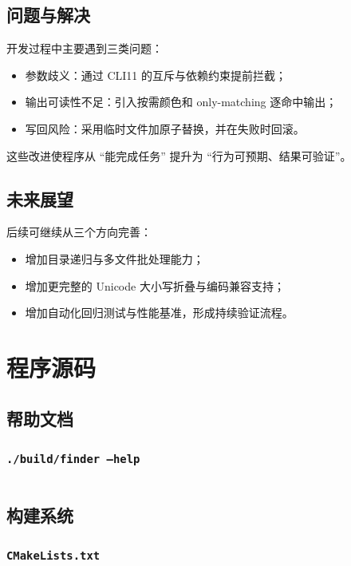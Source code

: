 \documentclass[12pt, a4paper]{ctexart}
\begin{document}
\subsection{问题与解决}

开发过程中主要遇到三类问题：

\begin{itemize}
    \item 参数歧义：通过 CLI11 的互斥与依赖约束提前拦截；
    \item 输出可读性不足：引入按需颜色和 only-matching 逐命中输出；
    \item 写回风险：采用临时文件加原子替换，并在失败时回滚。
\end{itemize}

这些改进使程序从 ``能完成任务'' 提升为 ``行为可预期、结果可验证''。

\subsection{未来展望}

后续可继续从三个方向完善：

\begin{itemize}
    \item 增加目录递归与多文件批处理能力；
    \item 增加更完整的 Unicode 大小写折叠与编码兼容支持；
    \item 增加自动化回归测试与性能基准，形成持续验证流程。
\end{itemize}

\appendix

\section{程序源码}

\subsection{帮助文档}

\subsubsection{\texttt{./build/finder --help}}
\inputminted{text}{../res/help.txt}

\subsection{构建系统}

\subsubsection{\texttt{CMakeLists.txt}}
\inputminted{cmake}{../CMakeLists.txt}
\end{document}

